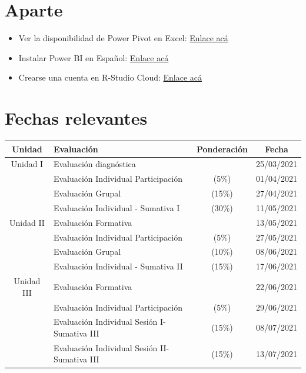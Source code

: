 \documentclass[12 pt,letterpaper]{article}
\begin{document}
\section{Aparte}

\begin{itemize}
	\item Ver la disponibilidad de Power Pivot en Excel: \href{https://support.microsoft.com/es-es/office/iniciar-el-complemento-power-pivot-para-excel-a891a66d-36e3-43fc-81e8-fc4798f39ea8}{Enlace acá}	
	
	\item Instalar Power BI en Español: \href{https://powerbi.microsoft.com/es-es/desktop/}{Enlace acá}
	
	\item Crearse una cuenta en R-Studio Cloud: \href{https://rstudio.cloud/}{Enlace acá}
		
\end{itemize}

\section{Fechas relevantes}

\begin{tabular}{|c|l|c|c|}
	\hline
	Unidad & Evaluación & Ponderación & Fecha \\
	\hline
	Unidad I & Evaluación diagnóstica & & 25/03/2021 \\
	\hline
	& Evaluación Individual Participación & (5\%) & 01/04/2021 \\
	\hline
	& Evaluación Grupal & (15\%) & 27/04/2021 \\
	\hline
	& Evaluación Individual - Sumativa I & (30\%) & 11/05/2021 \\
	\hline
	Unidad II & Evaluación Formativa & & 13/05/2021 \\
	\hline
	& Evaluación Individual Participación & (5\%) & 27/05/2021 \\
	\hline
	& Evaluación Grupal & (10\%) & 08/06/2021 \\
	\hline
	& Evaluación Individual - Sumativa II & (15\%) & 17/06/2021 \\
	\hline
	Unidad III & Evaluación Formativa & & 22/06/2021 \\
	\hline
	& Evaluación Individual Participación & (5\%) & 29/06/2021 \\
	\hline
	& Evaluación Individual Sesión I- Sumativa III & (15\%) & 08/07/2021 \\
	\hline
	& Evaluación Individual Sesión II- Sumativa III & (15\%) & 13/07/2021 \\
	\hline
\end{tabular}
\end{document}
